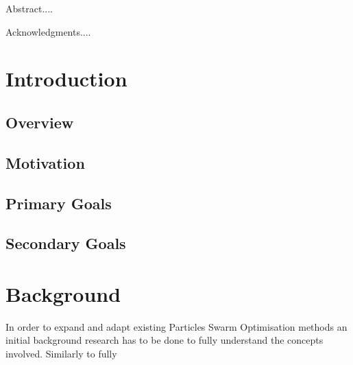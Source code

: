 \documentclass{pdfmx4020}
\begin{document}
\newfrontpage


\begin{Abstract}
Abstract....
\end{Abstract}

\begin{Acknowledgments}
Acknowledgments....
\end{Acknowledgments}

\StartThesis

\listoffigures
\listoftables

\chapter{Introduction}
  \section{Overview} %
  \label{sec:overview}
  

  \section{Motivation} %
  \label{sec:motivation}

  \section{Primary Goals} %
  \label{sec:primary_goals}
  

  \section{Secondary Goals} %
  \label{sec:secondary_goals}
  

\chapter{Background}\label{chap:background}
  In order to expand and adapt existing Particles Swarm Optimisation methods an initial background research has to be done to fully understand the concepts involved. Similarly to fully 
\end{document}
